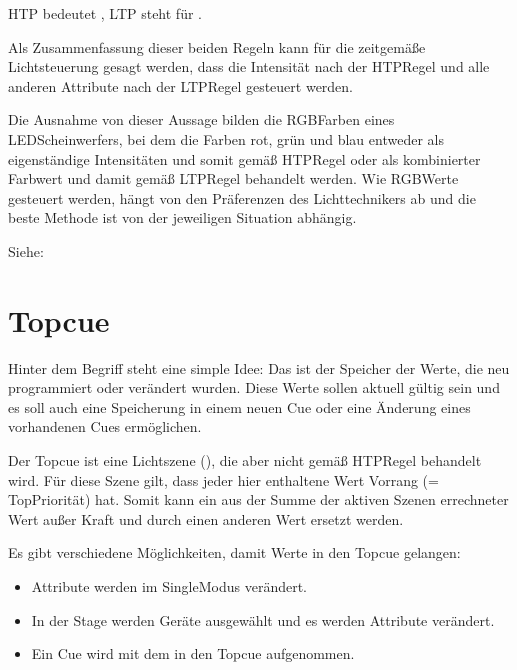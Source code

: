 \documentclass[letterpaper,10pt,ngerman]{sphinxmanual}
\begin{document}
HTP bedeutet , LTP steht für
.

Als Zusammenfassung dieser beiden Regeln kann für die zeitgemäße Lichtsteuerung
gesagt werden, dass die Intensität nach der HTP\sphinxhyphen{}Regel und alle anderen
Attribute nach der LTP\sphinxhyphen{}Regel gesteuert werden.

Die Ausnahme von dieser Aussage
bilden die RGB\sphinxhyphen{}Farben eines LED\sphinxhyphen{}Scheinwerfers, bei dem die Farben rot, grün und
blau entweder als eigenständige Intensitäten und somit gemäß HTP\sphinxhyphen{}Regel oder als
kombinierter Farbwert und damit gemäß LTP\sphinxhyphen{}Regel behandelt werden. Wie RGB\sphinxhyphen{}Werte
gesteuert werden, hängt von den Präferenzen des Lichttechnikers ab und die
beste Methode ist von der jeweiligen Situation abhängig.

Siehe: 


\section{Topcue}
\label{\detokenize{grundlagen:topcue}}\label{\detokenize{grundlagen:topcuelabel}}
Hinter dem Begriff  steht eine simple Idee: Das ist der Speicher
der Werte, die neu programmiert oder verändert wurden. Diese Werte sollen
aktuell gültig sein und es soll auch eine Speicherung in einem neuen Cue oder
eine Änderung eines vorhandenen Cues ermöglichen.

Der Topcue ist eine Lichtszene (), die aber nicht gemäß HTP\sphinxhyphen{}Regel
behandelt wird. Für diese Szene gilt, dass jeder hier enthaltene Wert
Vorrang (= Top\sphinxhyphen{}Priorität) hat. Somit kann ein aus der Summe der aktiven
Szenen errechneter Wert außer Kraft und durch einen anderen Wert ersetzt
werden.

Es gibt verschiedene Möglichkeiten, damit Werte in den Topcue gelangen:
\begin{itemize}
\item {} 
Attribute werden im Single\sphinxhyphen{}Modus verändert.

\item {} 
In der Stage werden Geräte ausgewählt und es werden Attribute
verändert.

\item {} 
Ein Cue wird mit dem  in den Topcue aufgenommen.

\end{itemize}
\end{document}
